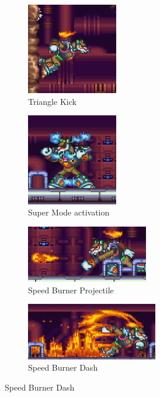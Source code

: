 \begin{figure}[htp]
	\centering
	\begin{subfigure}{0.4\linewidth}
		\centering
		\includegraphics[height=4cm]{figures/X2/Flame_stag/Stag_triangle.png}
		\caption{Triangle Kick}
	\end{subfigure}
	\begin{subfigure}{0.4\linewidth}
		\centering
		\includegraphics[height=4cm]{figures/X2/Flame_stag/Stag_phase_2.png}
		\caption{Super Mode activation}
	\end{subfigure}
	\begin{subfigure}{0.45\linewidth}
		\centering
		\includegraphics[height= 2.5cm]{figures/X2/Flame_stag/Stag_projectile.png}
		\caption{Speed Burner Projectile}
	\end{subfigure}
	\begin{subfigure}{0.45\linewidth}
		\centering
		\includegraphics[height=2.5cm]{figures/X2/Flame_stag/Stag_dash.png}
		\caption{Speed Burner Dash}
	\end{subfigure}
	
\end{figure}
